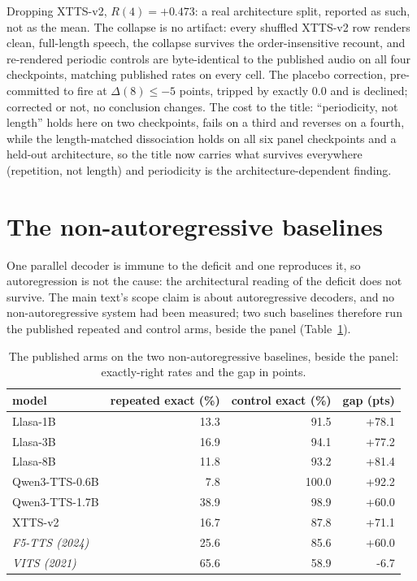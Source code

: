 \noindent Dropping XTTS-v2, $R(4)=+0.473$: a real architecture split,
reported as such, not as the mean. The collapse is no artifact: every
shuffled XTTS-v2 row renders clean, full-length speech, the collapse
survives the order-insensitive recount, and re-rendered periodic
controls are byte-identical to the published audio on all four
checkpoints, matching published rates on every cell. The placebo
correction, pre-committed to fire at $\Delta(8)\le-5$ points, tripped
by exactly $0.0$ and is declined; corrected or not, no conclusion
changes. The cost to the title: ``periodicity, not length'' holds here
on two checkpoints, fails on a third and reverses on a fourth, while
the length-matched dissociation holds on all six panel checkpoints and
a held-out architecture, so the title now carries what survives
everywhere (repetition, not length) and periodicity is the
architecture-dependent finding.

\section{The non-autoregressive baselines}
\label{sec:nonar}

One parallel decoder is immune to the deficit and one reproduces it,
so autoregression is not the cause: the architectural reading of the
deficit does not survive. The main text's scope claim is about
autoregressive decoders, and no non-autoregressive system had been
measured; two such baselines therefore run the published repeated and
control arms, beside the panel (Table~\ref{tab:nonar}).

\begin{table}[tp]\centering
\caption{The published arms on the two non-autoregressive baselines, beside the panel: exactly-right rates and the gap in points.}
\label{tab:nonar}
\begin{tabular}{lrrr}
\toprule
model & repeated exact (\%) & control exact (\%) & gap (pts) \\
\midrule
Llasa-1B & 13.3 & 91.5 & +78.1 \\
Llasa-3B & 16.9 & 94.1 & +77.2 \\
Llasa-8B & 11.8 & 93.2 & +81.4 \\
Qwen3-TTS-0.6B & 7.8 & 100.0 & +92.2 \\
Qwen3-TTS-1.7B & 38.9 & 98.9 & +60.0 \\
XTTS-v2 & 16.7 & 87.8 & +71.1 \\
\midrule
\emph{F5-TTS (2024)} & 25.6 & 85.6 & +60.0 \\
\emph{VITS (2021)} & 65.6 & 58.9 & -6.7 \\
\bottomrule
\end{tabular}
\end{table}

